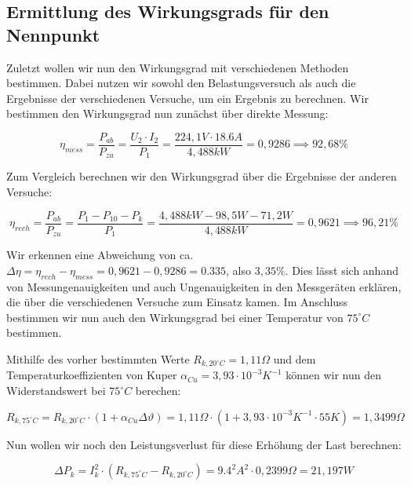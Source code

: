 \documentclass{article}
\begin{document}
\subsection{Ermittlung des Wirkungsgrads für den Nennpunkt}
\label{sec:ermittl-des-wirk}

Zuletzt wollen wir nun den Wirkungsgrad mit verschiedenen Methoden bestimmen. Dabei nutzen wir sowohl den Belastungsversuch als auch die Ergebnisse der verschiedenen Versuche, um ein Ergebnis zu berechnen. Wir bestimmen den Wirkungsgrad nun zunächst über direkte Messung:

\begin{equation*}
  \eta_{mess} = \frac{P_{ab}}{P_{zu}} = \frac{U_{2} \cdot I_{2}}{P_{1}} = \frac{224,1V \cdot 18.6A}{4,488kW} = 0,9286 \implies 92,68\%
\end{equation*}

Zum Vergleich berechnen wir den Wirkungsgrad über die Ergebnisse der anderen Versuche:

\begin{equation*}
  \eta_{rech} = \frac{P_{ab}}{P_{zu}} = \frac{P_{1} - P_{10} - P_{k}}{P_{1}} = \frac{4,488kW - 98,5W - 71,2W}{4,488kW} = 0,9621 \implies 96,21\%
\end{equation*}

Wir erkennen eine Abweichung von ca. $\Delta \eta = \eta_{rech} - \eta_{mess} = 0,9621 - 0,9286 = 0.335$, also $3,35\%$. Dies lässt sich anhand von Messungenauigkeiten und auch Ungenauigkeiten in den Messgeräten erklären, die über die verschiedenen Versuche zum Einsatz kamen. Im Anschluss bestimmen wir nun auch den Wirkungsgrad bei einer Temperatur von $75^{\circ}C$ bestimmen.

Mithilfe des vorher bestimmten Werte $R_{k,20^{\circ}C} = 1,11\Omega$ und dem Temperaturkoeffizienten von Kuper $\alpha_{Cu} = 3,93 \cdot 10^{-3}K^{-1}$ können wir nun den Widerstandswert bei $75^{\circ}C$ berechen:

\begin{equation*}
  \label{eq:4}
  R_{k,75^{\circ}C} = R_{k, 20^{\circ}C} \cdot (1+\alpha_{Cu}\Delta\vartheta) = 1,11\Omega \cdot (1+3,93\cdot 10^{-3}K^{-1}\cdot 55K) = 1,3499\Omega
\end{equation*}

Nun wollen wir noch den Leistungsverlust für diese Erhöhung der Last berechnen:

\begin{equation*}
  \label{eq:2}
  \Delta P_{k} = I_{k}^{2} \cdot (R_{k,75^{\circ}C} - R_{k,20^{\circ}C}) = 9.4^{2}A^{2} \cdot 0,2399\Omega = 21,197W
\end{equation*}
\end{document}

